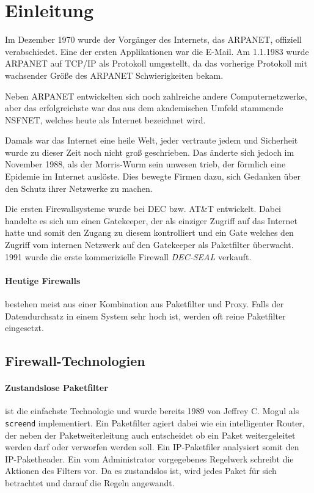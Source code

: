 \section{Einleitung}

Im Dezember 1970 wurde der Vorgänger des Internets, das ARPANET, offiziell
verabschiedet. Eine der ersten Applikationen war die E-Mail.
Am 1.1.1983 wurde ARPANET auf TCP/IP als Protokoll umgestellt,
da das vorherige Protokoll mit wachsender Größe des ARPANET Schwierigkeiten
bekam.

Neben ARPANET entwickelten sich noch zahlreiche andere Computernetzwerke,
aber das erfolgreichste war das aus dem akademischen Umfeld stammende NSFNET,
welches heute als Internet bezeichnet wird.

Damals war das Internet eine heile Welt, jeder vertraute jedem und Sicherheit
wurde zu dieser Zeit noch nicht groß geschrieben.
Das änderte sich jedoch im November 1988, als der Morris-Wurm sein unwesen
trieb, der förmlich eine Epidemie im Internet auslöste. Dies bewegte Firmen
dazu, sich Gedanken über den Schutz ihrer Netzwerke zu machen.

Die ersten Firewallsysteme wurde bei DEC bzw. AT\&T entwickelt. Dabei handelte
es sich um einen Gatekeeper, der als einziger Zugriff auf das Internet hatte
und somit den Zugang zu diesem kontrolliert und ein Gate welches den Zugriff
vom internen Netzwerk auf den Gatekeeper als Paketfilter überwacht.
1991 wurde die erste kommerizielle Firewall \emph{DEC-SEAL} verkauft.\cite{iptables}

\paragraph{Heutige Firewalls} bestehen meist aus einer Kombination aus
Paketfilter und Proxy. Falls der Datendurchsatz in einem System sehr
hoch ist, werden oft reine Paketfilter eingesetzt.\cite{iptables}


\subsection{Firewall-Technologien}

\paragraph{Zustandslose Paketfilter} ist die einfachste Technologie und
wurde bereits 1989 von Jeffrey C. Mogul als {\tt screend} implementiert.
Ein Paketfilter agiert dabei wie ein intelligenter Router, der
neben der Paketweiterleitung auch entscheidet ob ein Paket
weitergeleitet werden darf oder verworfen werden soll.
Ein IP-Paketfiler analysiert somit den IP-Paketheader.
Ein vom Administrator vorgegebenes Regelwerk schreibt die Aktionen
des Filters vor. Da es zustandslos ist, wird jedes Paket für sich
betrachtet und darauf die Regeln angewandt.\cite{iptables}


